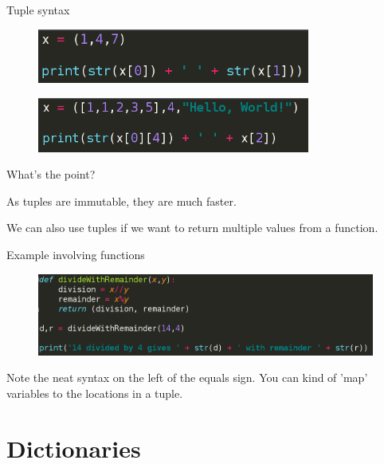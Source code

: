 \documentclass{beamer}
\begin{document}
\begin{frame}{Tuple syntax}

\begin{figure}[h]
\includegraphics[width=0.8\textwidth]{tuple}
\end{figure}
\pause
\begin{figure}[h]
\includegraphics[width=0.8\textwidth]{tuple2}
\end{figure}


\end{frame}


\begin{frame}{What's the point?}

As tuples are immutable, they are much faster.\\ \pause

We can also use tuples if we want to return multiple values from a function.

\end{frame}

\begin{frame}{Example involving functions}

\begin{figure}[h]
\includegraphics[width=0.99\textwidth]{tuplefunc}
\end{figure}
\pause
Note the neat syntax on the left of the equals sign. You can kind of 'map' variables to the locations in a tuple.
\end{frame}

\section{Dictionaries}
\end{document}
